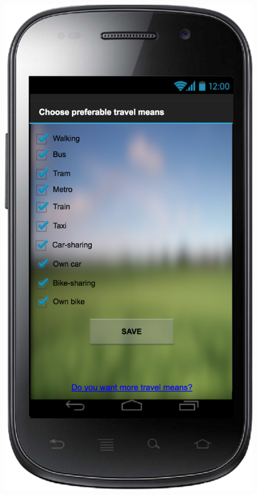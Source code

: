 \documentclass[a4paper,leqno]{article}
\begin{document}
\newpage
\begin{figure}
	\begin{minipage}[!h]{0.45\linewidth}
		\centering
		\includegraphics[scale=0.15]{choosePrefTransport}
	\end{minipage}

\end{figure}
\end{document}
